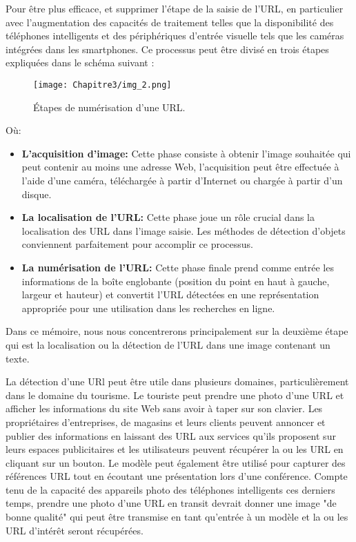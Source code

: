 Pour être plus efficace, et supprimer l'étape de la saisie de l'URL, en particulier avec l'augmentation des capacités de traitement telles que la disponibilité des téléphones intelligents et des périphériques d'entrée visuelle tels que les caméras intégrées dans les smartphones. Ce processus peut être divisé en trois étapes expliquées dans le schéma suivant :
     \begin{figure}[H]
          \centering
          \texttt{[image: Chapitre3/img\_2.png]}
          \caption{Étapes de numérisation d'une URL.}
          \label{img2}
          \end{figure}

Où: 
\begin{itemize}
\item \textbf{L'acquisition d'image:} Cette phase consiste à obtenir l'image souhaitée qui peut contenir au moins une adresse Web, l'acquisition peut être effectuée à l'aide d'une caméra, téléchargée à partir d'Internet ou chargée à partir d'un disque.
\item \textbf{La localisation de l'URL:} Cette phase joue un rôle crucial dans la localisation des URL dans l'image saisie. Les méthodes de détection d'objets conviennent parfaitement pour accomplir ce processus.
\item \textbf{La numérisation de l'URL:} Cette phase finale prend comme entrée les informations de la boîte englobante (position du point en haut à gauche, largeur et hauteur) et convertit l'URL détectées en une représentation appropriée pour une utilisation dans les recherches en ligne. 
\end{itemize}

Dans ce mémoire, nous nous concentrerons principalement sur la deuxième étape qui est la localisation ou la détection de l'URL dans une image contenant un texte.

La détection d'une URl peut être utile dans plusieurs domaines, particulièrement dans le domaine du tourisme. Le touriste peut prendre une photo d'une URL et afficher les informations du site Web sans avoir à taper sur son clavier. Les propriétaires d'entreprises, de magasins et leurs clients peuvent annoncer et publier des informations en laissant des URL aux services qu'ils proposent sur leurs espaces publicitaires et les utilisateurs peuvent récupérer la ou les URL en cliquant sur un bouton. Le modèle peut également être utilisé pour capturer des références URL tout en écoutant une présentation lors d'une conférence.  Compte tenu de la capacité des appareils photo des téléphones intelligents ces derniers temps, prendre une photo d'une URL en transit devrait donner une image "de bonne qualité" qui peut être transmise en tant qu'entrée à un modèle et la ou les URL d'intérêt seront récupérées.

